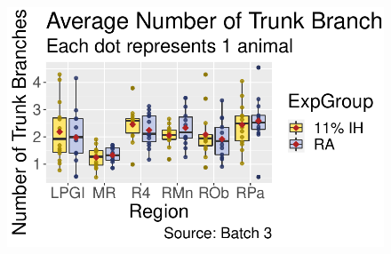 \documentclass[
  12pt,
  letterpaper,
  DIV=11,
  numbers=noendperiod]{scrartcl}
\begin{document}
\begin{figure}
\begin{minipage}[t]{0.33\linewidth}
{{\includegraphics{Fiber_analysis_quarto_files/figure-pdf/fig-expgroup_region-2.pdf}

}

}

\subcaption{\label{fig-expgroup_region-2}}
\end{minipage}%
%
\begin{minipage}[t]{0.33\linewidth}

{\centering 


}

\subcaption{\label{fig-expgroup_region-3}}
\end{minipage}%
\newline
\begin{minipage}[t]{0.33\linewidth}


\end{minipage}
\end{figure}
\end{document}
